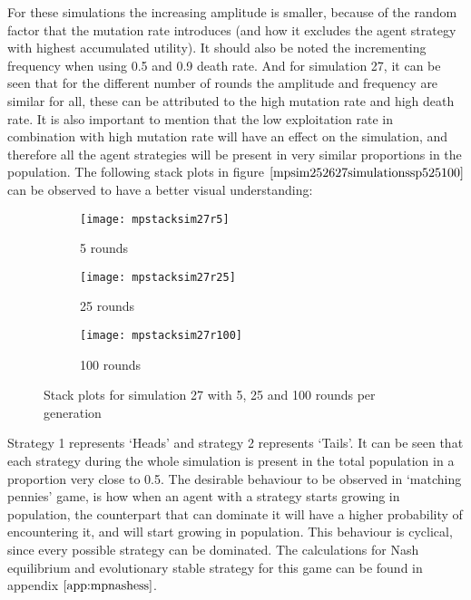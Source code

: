 For these simulations the increasing amplitude is smaller, because of the random factor that the mutation rate introduces (and how it excludes the agent strategy with highest accumulated utility). It should also be noted the incrementing frequency when using 0.5 and 0.9 death rate. And for simulation 27, it can be seen that for the different number of rounds the amplitude and frequency are similar for all, these  can be attributed to the high mutation rate and high death rate. It is also important to mention that the low exploitation rate in combination with high mutation rate will have an effect on the simulation, and therefore all the agent strategies will be present in very similar proportions in the population. The following stack plots in figure $\ref{mpsim252627simulationssp525100}$  can be observed to have a better visual understanding:  

\begin{figure}[H]       
    \centering
    \begin{subfigure}[b]{0.3\textwidth}
	\centering
	{\texttt{[image: mpstacksim27r5]}}   
    	\caption{5 rounds}
	\label{fig:mpsim27sr5}
    \end{subfigure}
    \hfill
    \begin{subfigure}[b]{0.3\textwidth}
	\centering
	{\texttt{[image: mpstacksim27r25]}}   
    	\caption{25 rounds}
	\label{fig:mpsim27sr25}
    \end{subfigure}
    \hfill
    \begin{subfigure}[b]{0.3\textwidth}
	\centering
	{\texttt{[image: mpstacksim27r100]}}   
    	\caption{100 rounds}
	\label{fig:mpsim27sr100}
    \end{subfigure}
    \caption{Stack plots for simulation 27 with 5, 25 and 100 rounds per generation}
    \label{mpsim252627simulationssp525100}
\end{figure}

Strategy 1 represents `Heads' and strategy 2 represents `Tails'. It can be seen that each strategy during the whole simulation is present in the total population in a proportion very close to 0.5. The desirable behaviour to be observed in `matching pennies' game, is how when an agent with a strategy starts growing in population, the counterpart that can dominate it will have a higher probability of encountering it, and will start growing in population. This behaviour is cyclical, since every possible strategy can be dominated.
The calculations for Nash equilibrium and evolutionary stable strategy for this game can be found in appendix $\ref{app:mpnashess}$.




